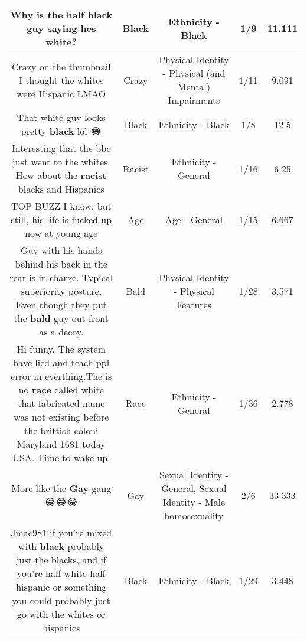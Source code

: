 \documentclass[11pt]{article}
\newlength\mylength
\begin{document}
\begin{center}
\begin{longtable}{|C{.65\mylength}|C{.30\mylength}|C{.12\mylength}|C{.12\mylength}|C{.12\mylength}|}
  \small Why is the half \textbf{black} guy saying hes white?\normalsize   & Black & Ethnicity - Black & 1/9 & 11.111 \\  \hline
  \small Crazy on the thumbnail I thought the whites were Hispanic LMAO\normalsize   & Crazy & Physical Identity - Physical (and Mental) Impairments & 1/11 & 9.091 \\  \hline
  \small That white guy looks pretty \textbf{black} lol 😂\normalsize   & Black & Ethnicity - Black & 1/8 & 12.5 \\  \hline
  \small Interesting that the bbc just went to the whites. How about the \textbf{racist} blacks and Hispanics\normalsize   & Racist & Ethnicity - General & 1/16 & 6.25 \\  \hline
  \small TOP BUZZ I know, but still, his life is fucked up now at young age\normalsize   & Age & Age - General & 1/15 & 6.667 \\  \hline
  \small Guy with his hands behind his back in the rear is in charge. Typical superiority posture. Even though they put the \textbf{bald} guy out front as a decoy.\normalsize   & Bald & Physical Identity - Physical Features & 1/28 & 3.571 \\  \hline
  \small Hi funny. The system have lied and teach ppl error in everthing.The is no \textbf{race} called white that fabricated name was not existing before the brittish coloni Maryland 1681 today USA. Time to wake up.\normalsize   & Race & Ethnicity - General & 1/36 & 2.778 \\  \hline
  \small More like the \textbf{G\textbf{ay}} gang 😂😂😂\normalsize   & Gay & Sexual Identity - General, Sexual Identity - Male homosexuality & 2/6 & 33.333 \\  \hline
  \small Jmac981 if you're mixed with \textbf{black} probably just the blacks, and if you're half white half hispanic or something you could probably just go with the whites or hispanics\normalsize   & Black & Ethnicity - Black & 1/29 & 3.448 \\  \hline

\end{longtable}
\end{center}
\end{document}
